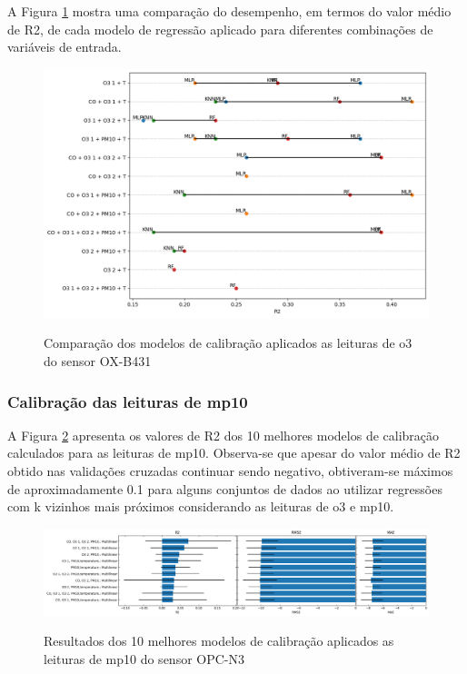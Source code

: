 A Figura \ref{fig:data-o3-all-models-comparison} mostra uma comparação do desempenho, em termos do valor médio de R2, de cada modelo de regressão aplicado para diferentes combinações de variáveis de entrada.

\begin{figure}[h]
    \centering
    \caption{Comparação dos modelos de calibração aplicados as leituras de \acrshort{o3} do sensor OX-B431}
    \includegraphics[width=\textwidth]{chapters/3-RESULTADOS CAMPO/Figuras/o3-all-models-comparison.png}
    \label{fig:data-o3-all-models-comparison}
\end{figure}

\subsubsection{Calibração das leituras de \acrshort{mp10}}

A Figura \ref{fig:data-pm10-all-models-performance} apresenta os valores de R2 dos 10 melhores modelos de calibração calculados para as leituras de \acrshort{mp10}. Observa-se que apesar do valor médio de R2 obtido nas validações cruzadas continuar sendo negativo, obtiveram-se máximos de aproximadamente 0.1 para alguns conjuntos de dados ao utilizar regressões com k vizinhos mais próximos considerando as leituras de \acrshort{o3} e \acrshort{mp10}.

\begin{figure}[h]
    \centering
    \caption{Resultados dos 10 melhores modelos de calibração aplicados as leituras de \acrshort{mp10} do sensor OPC-N3}
    \includegraphics[width=\textwidth]{chapters/3-RESULTADOS CAMPO/Figuras/pm10-all-models-performance.png}
    \label{fig:data-pm10-all-models-performance}
\end{figure}

